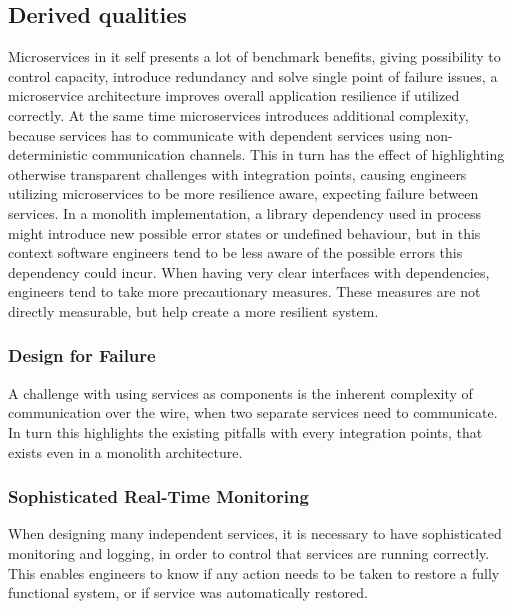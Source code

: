 \subsection{Derived qualities}
Microservices in it self presents a lot of benchmark benefits, giving possibility to control capacity, introduce redundancy and solve single point of failure issues, a microservice architecture improves overall application resilience if utilized correctly. At the same time microservices introduces additional complexity, because services has to communicate with dependent services using non-deterministic communication channels. This in turn has the effect of highlighting otherwise transparent challenges with integration points, causing engineers utilizing microservices to be more resilience aware, expecting failure between services. In a monolith implementation, a library dependency used in process might introduce new possible error states or undefined behaviour, but in this context software engineers tend to be less aware of the possible errors this dependency could incur. When having very clear interfaces with dependencies, engineers tend to take more precautionary measures. These measures are not directly measurable, but help create a more resilient system. 

\subsubsection*{Design for Failure}
A challenge with using services as components is the inherent complexity of communication over the wire, when two separate services need to communicate. In turn this highlights the existing pitfalls with every integration points, that exists even in a monolith architecture.

\subsubsection*{Sophisticated Real-Time Monitoring}
When designing many independent services, it is necessary to have sophisticated monitoring and logging, in order to control that services are running correctly. This enables engineers to know if any action needs to be taken to restore a fully functional system, or if service was automatically restored.